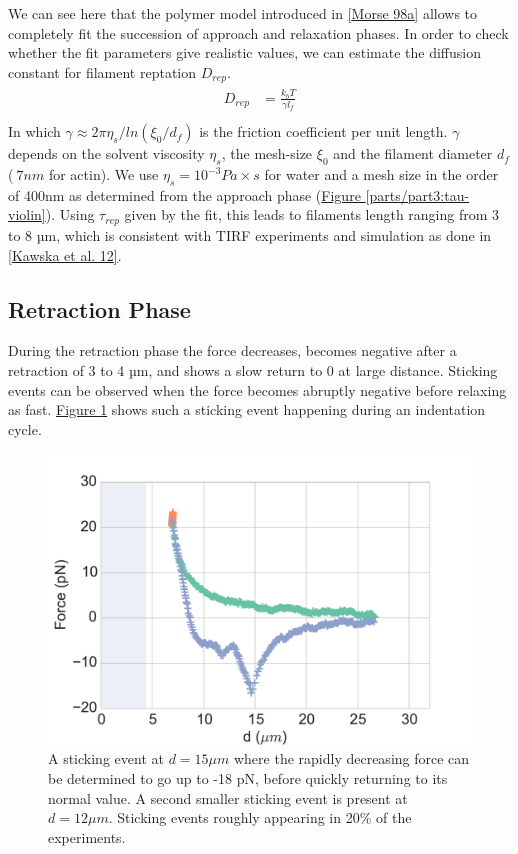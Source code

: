 \documentclass[A4paperpaper,11pt,english]{sphinxmanual}
\begin{document}
We can see here that the polymer model introduced in {\hyperref[parts/part3:morse1998a]{{[}Morse 98a{]}}} allows
to completely fit the succession of approach and relaxation phases.  In order to check whether
the fit parameters give realistic values, we can estimate the diffusion constant
for filament reptation \(D_{rep}\).
\label{parts/part3:equation-eqa3-10}\begin{gather}
\begin{split}D_{rep} &= \frac{k_bT}{\gamma l_f} \\\end{split}\label{parts/part3-eqa3-10}
\end{gather}
In which \(\gamma\approx {2\pi\eta_s}/{ln(\xi_0/d_f)}\) is the friction
coefficient per unit length. \(\gamma\) depends on the solvent viscosity
\(\eta_s\), the mesh-size \(\xi_0\) and the filament diameter
\(d_f\) (\(~7nm\) for actin).  We use \(\eta_s=10^{-3} Pa\times s\)
for water and a mesh size in the order of 400nm as determined from the approach phase
(\hyperref[parts/part3:tau-violin]{Figure  \ref*{parts/part3:tau-violin}}). Using \(\tau_{rep}\) given by the fit, this leads to filaments
length ranging from 3 to 8 µm, which is consistent with TIRF experiments and simulation as done in {\hyperref[parts/part3:kawska2012]{{[}Kawska et al. 12{]}}}.


\subsection{Retraction Phase}
\label{parts/part3:retraction-phase}
During the retraction phase the force decreases, becomes negative after a
retraction of 3 to 4 µm, and shows a slow  return to 0 at large distance.
Sticking events can be observed when the force becomes abruptly negative before
relaxing as fast. \hyperref[parts/part3:sticking-event]{Figure  \ref*{parts/part3:sticking-event}} shows such a sticking event
happening during an indentation cycle.
\begin{figure}[htbp]
\centering
\capstart

\includegraphics[width=0.800\linewidth]{sticking-event.pdf}
\caption{A sticking event at \(d=15\mu{}m\) where the rapidly decreasing force can be determined to go
up to -18 pN, before quickly returning to its normal value. A second smaller
sticking event is present at \(d=12\mu{}m\). Sticking events roughly appearing in 20\% of
the experiments.}\label{parts/part3:sticking-event}\end{figure}
\end{document}

